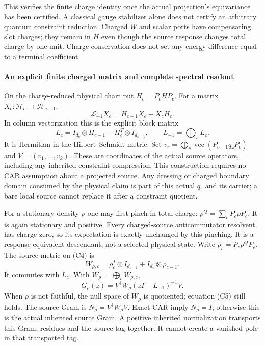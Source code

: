 \documentclass[12pt,a4paper]{article}
\begin{document}
This verifies the finite charge identity once the actual projection's
equivariance has been certified. A classical gauge stabilizer alone does
not certify an arbitrary quantum constraint reduction. Charged $W$ and
scalar ports have compensating slot charges; they remain in $H$ even though
the source response changes total charge by one unit. Charge conservation
does not set any energy difference equal to a terminal coefficient.



\paragraph{An explicit finite charged matrix and complete spectral readout}
On the charge-reduced physical chart put $H_c=P_cHP_c$. For a matrix
$X_c:\mathcal H_c\to\mathcal H_{c-1}$,
\[
 \mathcal L_{-1}X_c=H_{c-1}X_c-X_cH_c.
\]
In column vectorization this is the explicit block matrix
\[
 \boxed{L_c=I_{d_c}\otimes H_{c-1}-H_c^T\otimes I_{d_{c-1}},
 \qquad L_{-1}=\bigoplus_cL_c.}
 \tag{C4}
\]
It is Hermitian in the Hilbert--Schmidt metric. Set
$v_r=\bigoplus_c\operatorname{vec}(P_{c-1}q_rP_c)$ and
$V=(v_1,\ldots,v_k)$. These are coordinates of the actual source operators,
including any inherited constraint compression. This construction requires
no CAR assumption about a projected source. Any dressing or charged boundary
domain consumed by the physical claim is part of this actual $q_r$ and its
carrier; a bare local source cannot replace it after a constraint quotient.

For a stationary density $\rho$ one may first pinch in total charge:
$\rho^Q=\sum_cP_c\rho P_c$. It is again stationary and positive. Every
charged-source anticommutator resolvent has charge zero, so its expectation
is exactly unchanged by this pinching. It is a response-equivalent
descendant, not a selected physical state.
Write $\rho_c=P_c\rho^QP_c$. The source metric on (C4) is
\[
 \boxed{W_{\rho,c}=\rho_c^T\otimes I_{d_{c-1}}
                         +I_{d_c}\otimes\rho_{c-1}.}
\]
It commutes with $L_c$. With $W_\rho=\bigoplus_cW_{\rho,c}$,
\[
 \boxed{G_\rho(z)=V^\dagger W_\rho(zI-L_{-1})^{-1}V.}
 \tag{C5}
\]
When $\rho$ is not faithful, the null space of $W_\rho$ is quotiented;
equation (C5) still holds. The source Gram is
$N_\rho=V^\dagger W_\rho V$. Exact CAR imply $N_\rho=I$; otherwise this
is the actual inherited source Gram. A positive inherited normalization
transports this Gram, residues and the source tag together. It cannot create
a vanished pole in that transported tag.
\end{document}
